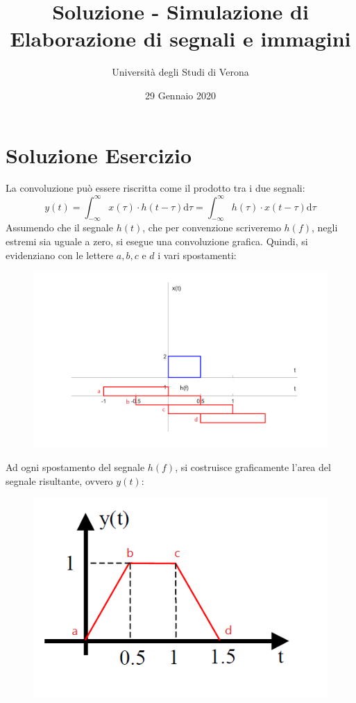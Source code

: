 \documentclass[a4paper]{article}
\begin{document}
	\author{Università degli Studi di Verona}
	\title{Soluzione - Simulazione di Elaborazione di segnali e immagini}
	\date{{\Large 29 Gennaio 2020}}
	\maketitle
	
	\section{Soluzione Esercizio}
	
	La convoluzione può essere riscritta come il prodotto tra i due segnali:
	\begin{equation*}
		y\left(t\right) = \displaystyle\int_{-\infty}^{\infty} x\left(\tau\right) \cdot h\left(t - \tau\right) \mathrm{d}\tau = \int_{-\infty}^{\infty} h\left(\tau\right) \cdot x\left(t-\tau\right) \mathrm{d}\tau
	\end{equation*}
	Assumendo che il segnale $h\left(t\right)$, che per convenzione scriveremo $h\left(f\right)$, negli estremi sia uguale a zero, si esegue una convoluzione grafica. Quindi, si evidenziano con le lettere $a,b,c$ e $d$ i vari spostamenti:
	\begin{figure}[!htp]
		\centering
		\includegraphics[width=\textwidth]{img/fig_1.png}
	\end{figure}\newpage

	\noindent
	Ad ogni spostamento del segnale $h\left(f\right)$, si costruisce graficamente l'area del segnale risultante, ovvero $y\left(t\right)$:
	\begin{figure}[!htp]
		\centering
		\includegraphics[width=.4\textwidth]{img/fig_2.png}
	\end{figure}
\end{document}
